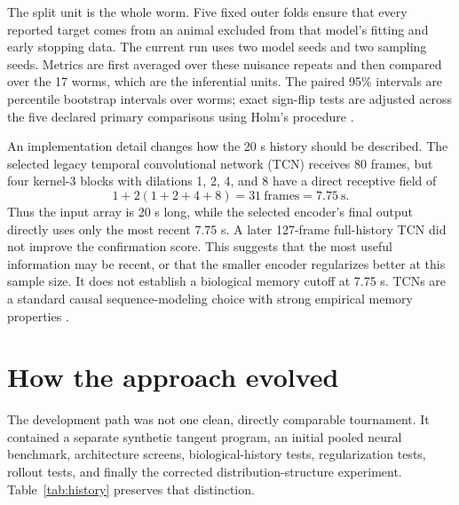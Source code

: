 \documentclass[11pt]{article}
\begin{document}
The split unit is the whole worm. Five fixed outer folds ensure that every reported target comes from an animal excluded from that model's fitting and early stopping data. The current run uses two model seeds and two sampling seeds. Metrics are first averaged over these nuisance repeats and then compared over the 17 worms, which are the inferential units. The paired 95\% intervals are percentile bootstrap intervals over worms; exact sign-flip tests are adjusted across the five declared primary comparisons using Holm's procedure \citep{holm1979multiple}.

An implementation detail changes how the 20 s history should be described. The selected legacy temporal convolutional network (TCN) receives 80 frames, but four kernel-3 blocks with dilations 1, 2, 4, and 8 have a direct receptive field of
\[
 1+2(1+2+4+8)=31\ \text{frames}=7.75\ \text{s}.
\]
Thus the input array is 20 s long, while the selected encoder's final output directly uses only the most recent 7.75 s. A later 127-frame full-history TCN did not improve the confirmation score. This suggests that the most useful information may be recent, or that the smaller encoder regularizes better at this sample size. It does not establish a biological memory cutoff at 7.75 s. TCNs are a standard causal sequence-modeling choice with strong empirical memory properties \citep{bai2018tcn}.

\section{How the approach evolved}

The development path was not one clean, directly comparable tournament. It contained a separate synthetic tangent program, an initial pooled neural benchmark, architecture screens, biological-history tests, regularization tests, rollout tests, and finally the corrected distribution-structure experiment. Table~\ref{tab:history} preserves that distinction.
\end{document}
